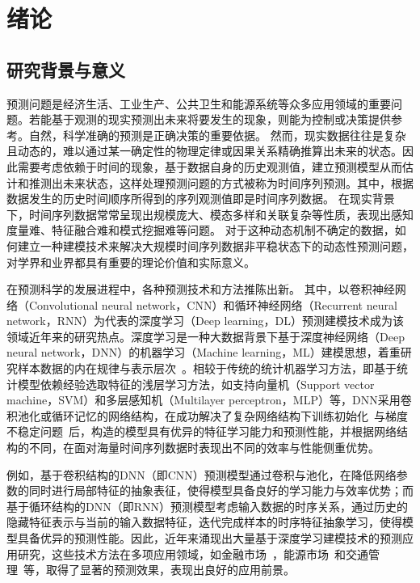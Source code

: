 
\chapter{绪论}
\section{研究背景与意义}
预测问题是经济生活、工业生产、公共卫生和能源系统等众多应用领域的重要问题。若能基于观测的现实预测出未来将要发生的现象，则能为控制或决策提供参考。自然，科学准确的预测是正确决策的重要依据。
然而，现实数据往往是复杂且动态的，难以通过某一确定性的物理定律或因果关系精确推算出未来的状态。因此需要考虑依赖于时间的现象，基于数据自身的历史观测值，建立预测模型从而估计和推测出未来状态，这样处理预测问题的方式被称为时间序列预测。其中，根据数据发生的历史时间顺序所得到的序列观测值即是时间序列数据。
在现实背景下，时间序列数据常常呈现出规模庞大、模态多样和关联复杂等性质，表现出感知度量难、特征融合难和模式挖掘难等问题。
对于这种动态机制不确定的数据，如何建立一种建模技术来解决大规模时间序列数据非平稳状态下的动态性预测问题，对学界和业界都具有重要的理论价值和实际意义。

在预测科学的发展进程中，各种预测技术和方法推陈出新。
其中，以卷积神经网络（Convolutional neural network，CNN）和循环神经网络（Recurrent neural network，RNN）为代表的深度学习（Deep learning，DL）预测建模技术成为该领域近年来的研究热点。深度学习是一种大数据背景下基于深度神经网络（Deep neural network，DNN）的机器学习（Machine learning，ML）建模思想，着重研究样本数据的内在规律与表示层次~\cite{hintonReducing2006}。相较于传统的统计机器学习方法，即基于统计模型依赖经验选取特征的浅层学习方法，如支持向量机（Support vector machine，SVM）和多层感知机（Multilayer perceptron，MLP）等，DNN采用卷积池化或循环记忆的网络结构，在成功解决了复杂网络结构下训练初始化~\cite{heDelving2015,glorotUnderstanding2010}与梯度不稳定问题~\cite{mikolovContext2012,pascanuDifficulty2013}后，构造的模型具有优异的特征学习能力和预测性能，并根据网络结构的不同，在面对海量时间序列数据时表现出不同的效率与性能侧重优势。

例如，基于卷积结构的DNN（即CNN）预测模型通过卷积与池化，在降低网络参数的同时进行局部特征的抽象表征，使得模型具备良好的学习能力与效率优势；而基于循环结构的DNN（即RNN）预测模型考虑输入数据的时序关系，通过历史的隐藏特征表示与当前的输入数据特征，迭代完成样本的时序特征抽象学习，使得模型具备优异的预测性能。因此，近年来涌现出大量基于深度学习建模技术的预测应用研究，这些技术方法在多项应用领域，如金融市场~\cite{wuImproved2019,zhaoDeep2017,sezerFinancial2020}，能源市场~\cite{caiDayahead2019,lindbergLongterm2019,shiDeep2018}和交通管理~\cite{laptevTimeseries2017,wangTraffic2016,xiaoShortterm2019}等，取得了显著的预测效果，表现出良好的应用前景。

